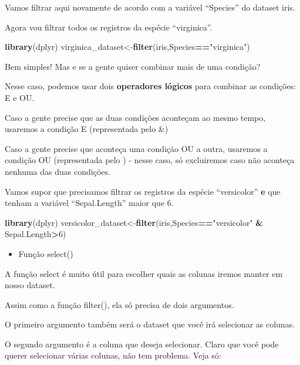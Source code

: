 \documentclass[
]{book}
\newenvironment{Shaded}{\begin{snugshade}}{\end{snugshade}}
\newcommand{\DecValTok}[1]{\textcolor[rgb]{0.00,0.00,0.81}{#1}}
\newcommand{\KeywordTok}[1]{\textcolor[rgb]{0.13,0.29,0.53}{\textbf{#1}}}
\newcommand{\NormalTok}[1]{#1}
\newcommand{\OperatorTok}[1]{\textcolor[rgb]{0.81,0.36,0.00}{\textbf{#1}}}
\newcommand{\StringTok}[1]{\textcolor[rgb]{0.31,0.60,0.02}{#1}}
\providecommand{\tightlist}{%
  \setlength{\itemsep}{0pt}\setlength{\parskip}{0pt}}
\begin{document}
Vamos filtrar aqui novamente de acordo com a variável ``Species'' do
dataset iris.

Agora vou filtrar todos os registros da espécie ``virginica''.

\begin{Shaded}
\begin{Highlighting}[]
\KeywordTok{library}\NormalTok{(dplyr)}
\NormalTok{virginica_dataset<-}\KeywordTok{filter}\NormalTok{(iris,Species}\OperatorTok{==}\StringTok{"virginica"}\NormalTok{)}
\end{Highlighting}
\end{Shaded}

Bem simples! Mas e se a gente quiser combinar mais de uma condição?

Nesse caso, podemos usar dois \textbf{operadores lógicos} para combinar
as condições: E e OU.

Caso a gente precise que as duas condições aconteçam ao mesmo tempo,
usaremos a condição E (representada pelo \&)

Caso a gente precise que aconteça uma condição OU a outra, usaremos a
condição OU (representada pelo \textbar) - nesse caso, só excluiremos
caso não aconteça nenhuma das duas condições.

Vamos supor que precisamos filtrar os registros da espécie
``versicolor'' \textbf{e} que tenham a variável ``Sepal.Length'' maior
que 6.

\begin{Shaded}
\begin{Highlighting}[]
\KeywordTok{library}\NormalTok{(dplyr)}
\NormalTok{versicolor_dataset<-}\KeywordTok{filter}\NormalTok{(iris,Species}\OperatorTok{==}\StringTok{"versicolor"} \OperatorTok{&}\StringTok{ }\NormalTok{Sepal.Length}\OperatorTok{>}\DecValTok{6}\NormalTok{)}
\end{Highlighting}
\end{Shaded}

\begin{itemize}
\tightlist
\item
  Função select()
\end{itemize}

A função select é muito útil para escolher quais as colunas iremos
manter em nosso dataset.

Assim como a função filter(), ela só precisa de dois argumentos.

O primeiro argumento também será o dataset que você irá selecionar as
colunas.

O segundo argumento é a coluna que deseja selecionar. Claro que você
pode querer selecionar várias colunas, não tem problema. Veja só:
\end{document}
